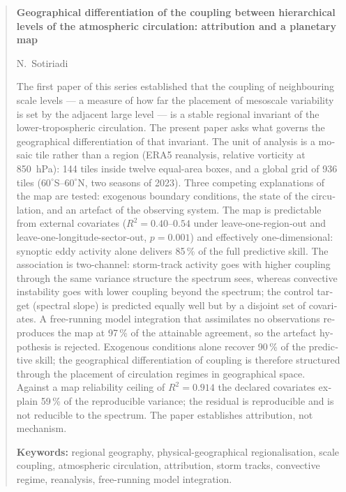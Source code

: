\documentclass[11pt,a4paper]{article}
\newenvironment{englishblock}{\begin{otherlanguage}{english}}{\end{otherlanguage}}
\newenvironment{englishblock}{\begin{english}}{\end{english}}
\begin{document}
\begin{englishblock}
\begin{abstract}
\noindent\textbf{Geographical differentiation of the coupling between hierarchical levels of the
atmospheric circulation: attribution and a planetary map}

\smallskip\noindent N.~Sotiriadi

\smallskip\noindent The first paper of this series established that the coupling of neighbouring
scale levels --- a measure of how far the placement of mesoscale variability is set by the adjacent
large level --- is a stable regional invariant of the lower-tropospheric circulation. The present
paper asks what governs the geographical differentiation of that invariant. The unit of analysis is
a mosaic tile rather than a region (ERA5 reanalysis, relative vorticity at 850~hPa): 144 tiles inside
twelve equal-area boxes, and a global grid of 936 tiles ($60^\circ$S--$60^\circ$N, two seasons of
2023). Three competing explanations of the map are tested: exogenous boundary conditions, the state
of the circulation, and an artefact of the observing system. The map is predictable from external
covariates ($R^2=0.40$--$0.54$ under leave-one-region-out and leave-one-longitude-sector-out,
$p=0.001$) and effectively one-dimensional: synoptic eddy activity alone delivers 85\,\% of the full
predictive skill. The association is two-channel: storm-track activity goes with higher coupling
through the same variance structure the spectrum sees, whereas convective instability goes with lower
coupling beyond the spectrum; the control target (spectral slope) is predicted equally well but by a
disjoint set of covariates. A free-running model integration that assimilates no observations
reproduces the map at 97\,\% of the attainable agreement, so the artefact hypothesis is rejected.
Exogenous conditions alone recover 90\,\% of the predictive skill; the geographical differentiation
of coupling is therefore structured through the placement of circulation regimes in geographical
space. Against a map reliability ceiling of $R^2=0.914$ the declared covariates explain 59\,\% of
the reproducible variance; the residual is reproducible and is not reducible to the spectrum. The
paper establishes attribution, not mechanism.

\smallskip
\noindent\textbf{Keywords:} regional geography, physical-geographical regionalisation, scale
coupling, atmospheric circulation, attribution, storm tracks, convective regime, reanalysis,
free-running model integration.
\end{abstract}
\end{englishblock}
\end{document}
